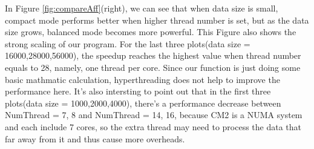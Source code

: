 \documentclass[article]{scrartcl}
\begin{document}
  In Figure \ref{fig:compareAff}(right), we can see that when data size is small, compact mode performs better when higher thread number is set,
  but as the data size grows, balanced mode becomes more powerful. This Figure also shows the strong scaling of our program.
  For the last three plots(data size = 16000,28000,56000), the speedup reaches the highest value when thread number equals to 28,
  namely, one thread per core. Since our function is just doing some basic mathmatic calculation, hyperthreading does not help to improve the performance here.
  It's also intersting to point out that in the first three plots(data size = 1000,2000,4000), there's a performance decrease between NumThread = 7, 8 and NumThread = 14, 16,
  because CM2 is a NUMA system and each include 7 cores, so the extra thread may need to process the data that far away from it and thus cause more overheads.
\end{document}
